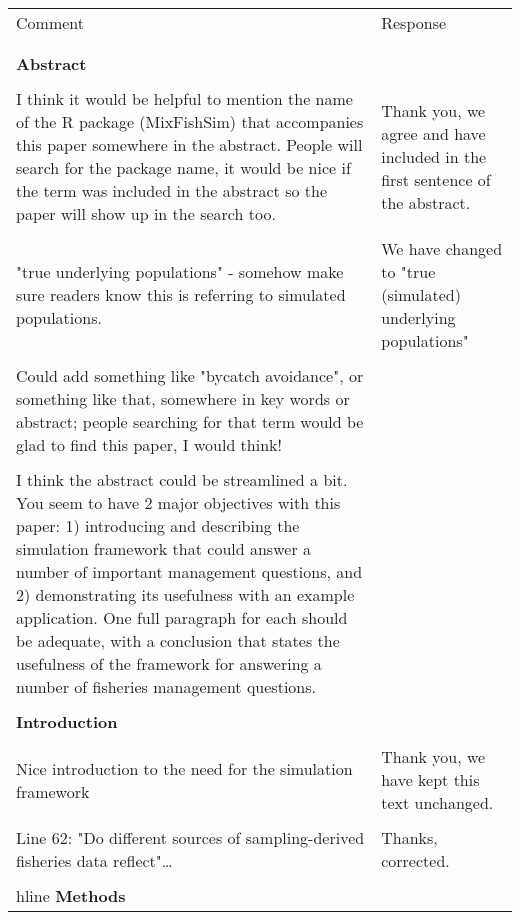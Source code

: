 \documentclass[10pt]{letter}
\begin{document}
\begin{landscape}
\large
	\begin{center}
	\begin{longtable}{p{12cm} | p{12cm}}
		\toprule
		Comment & Response \\
		\\
		\hline
		\\
		\textbf{Abstract} & \\
\\
I think it would be helpful to mention the name of the R package (MixFishSim)
that accompanies this paper somewhere in the abstract. People will search for
the package name, it would be nice if the term was included in the abstract so
the paper will show up in the search too. & Thank you, we agree and have
included in the first sentence of the abstract. \\
\\
"true underlying populations" - somehow make sure readers know this is
referring to simulated populations. & We have changed to "true (simulated)
underlying populations" \\
\\
Could add something like "bycatch avoidance", or something like that, somewhere
in key words or abstract; people searching for that term would be glad to find
this paper, I would think! & \\
\\
I think the abstract could be streamlined a bit. You seem to have 2 major
objectives with this paper: 1) introducing and describing the simulation
framework that could answer a number of important management questions, and 2)
demonstrating its usefulness with an example application. One full paragraph
for each should be adequate, with a conclusion that states the usefulness of
the framework for answering a number of fisheries management questions.  & \\
\\
		\hline
		\textbf{Introduction} &  \\
\\
Nice introduction to the need for the simulation framework & Thank you, we have
kept this text unchanged. \\
\\
Line 62: "Do different sources of sampling-derived fisheries data reflect"… &
Thanks, corrected. \\
\\
		hline
		\textbf{Methods} &  \\

\end{longtable}
\end{center}
\end{landscape}
\end{document}
